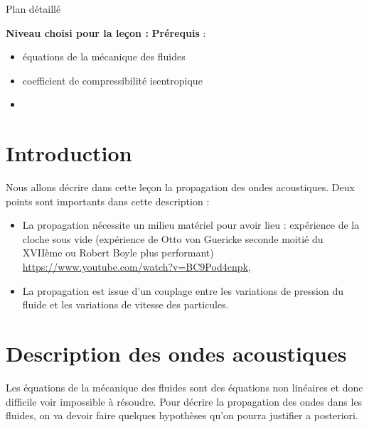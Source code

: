 
\begin{reportBlock}{Plan détaillé}

  \textbf{Niveau choisi pour la leçon :} 
  \newline
  \textbf{Prérequis} : \begin{itemize}
      \item équations de la mécanique des fluides
      \item coefficient de compressibilité isentropique
      \item 
  \end{itemize}
  
  \section*{Introduction}
  Nous allons décrire dans cette leçon la propagation des ondes acoustiques. Deux points sont importants dans cette description :
  \begin{itemize}
      \item La propagation nécessite un milieu matériel pour avoir lieu : expérience de la cloche sous vide (expérience de Otto von Guericke seconde moitié du XVIIème ou Robert Boyle plus performant) \url{https://www.youtube.com/watch?v=BC9Pod4cnpk},
      \item La propagation est issue d'un couplage entre les variations de pression du fluide et les variations de vitesse des particules.
  \end{itemize}
  
  \section{Description des ondes acoustiques}
  Les équations de la mécanique des fluides sont des équations non linéaires et donc difficile voir impossible à résoudre. Pour décrire la propagation des ondes dans les fluides, on va devoir faire quelques hypothèses qu'on pourra justifier a posteriori.
  

\end{reportBlock}
